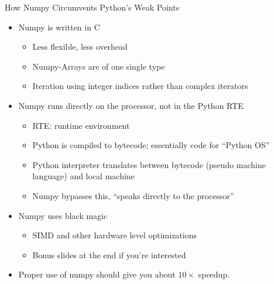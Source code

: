 \begin{frame}[fragile]{How Numpy Circumvents Python's Weak Points}
%
\begin{itemize}
\item Numpy is written in C
	\begin{itemize}
	\item Less flexible, less overhead
	\item Numpy-Arrays are of one single type
	\item Iteration using integer indices rather than complex iterators
	\end{itemize}
\item Numpy runs directly on the processor, not in the Python RTE
	\begin{itemize}
	\item RTE: runtime environment
	\item Python is compiled to bytecode; essentially code for \enquote{Python OS}
	\item Python interpreter translates between bytecode (pseudo machine language) and local machine
	\item Numpy bypasses this, \enquote{speaks directly to the processor} 
	\end{itemize}
\item Numpy uses black magic
	\begin{itemize}
	\item SIMD and other hardware level optimizations
	\item Bonus slides at the end if you're interested
	\end{itemize}
\item[\Thus] Proper use of numpy should give you about $10\times$ speedup.
\end{itemize}
%
\end{frame}


